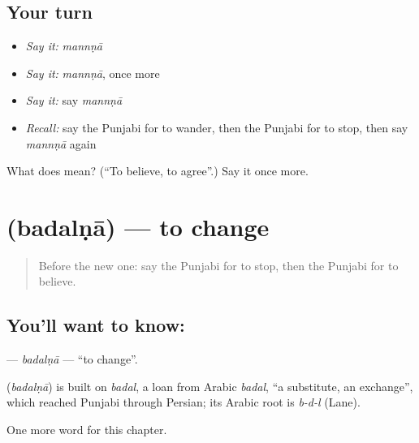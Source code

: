 \subsection*{Your turn}
\begin{itemize}
\raggedright
  \item \emph{Say it:} \emph{mannṇā}
  \item \emph{Say it:} \emph{mannṇā}, once more
  \item \emph{Say it:} say \emph{mannṇā}
  \item \emph{Recall:} say the Punjabi for to wander, then the Punjabi for to stop, then say \emph{mannṇā} again
\end{itemize}

\begin{tcolorbox}[breakable,colback=teal!4,colframe=teal!35!black,title={Before you move on}]
What does  mean? (\textquotedblleft{}To believe, to agree\textquotedblright{}.) Say it once more.
\end{tcolorbox}
\section[\texorpdfstring{\pa{ਬਦਲਣਾ} (badalṇā)}{ਬਦਲਣਾ (badalṇā)}]{ (badalṇā) — to change}

\label{lesson:PA-C152-badalna}



\begin{quote}
Before the new one: say the Punjabi for to stop, then the Punjabi for to believe.
\end{quote}

\subsection*{You'll want to know: }
\textbf{} — \emph{badalṇā} — \textquotedblleft{}to change\textquotedblright{}.

\begin{cousinweb}
\textbf{} (\emph{badalṇā}) is built on \emph{badal}, a loan from Arabic \emph{badal}, \textquotedblleft{}a substitute, an exchange\textquotedblright{}, which reached Punjabi through Persian; its Arabic root is \emph{b-d-l} (Lane).
\end{cousinweb}

\begin{grammarlens}[title={What you've built}]
One more word for this chapter.
\end{grammarlens}

